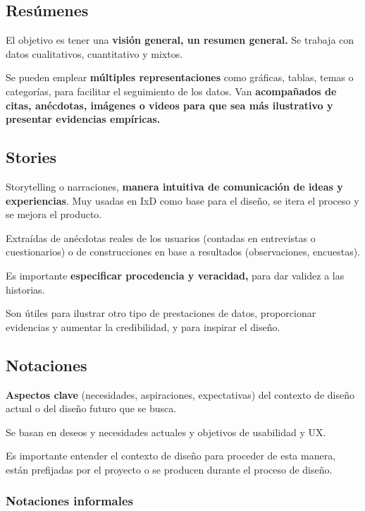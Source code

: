 \hypertarget{resuxfamenes}{%
\subsection{Resúmenes}\label{resuxfamenes}}

El objetivo es tener una \textbf{visión general, un resumen general.} Se
trabaja con datos cualitativos, cuantitativo y mixtos.

Se pueden emplear \textbf{múltiples representaciones} como gráficas,
tablas, temas o categorías, para facilitar el seguimiento de los datos.
Van \textbf{acompañados de citas, anécdotas, imágenes o videos para que
sea más ilustrativo y presentar evidencias empíricas.}

\hypertarget{stories}{%
\subsection{Stories}\label{stories}}

Storytelling o narraciones, \textbf{manera intuitiva de comunicación de
ideas y experiencias}. Muy usadas en IxD como base para el diseño, se
itera el proceso y se mejora el producto.

Extraídas de anécdotas reales de los usuarios (contadas en entrevistas o
cuestionarios) o de construcciones en base a resultados (observaciones,
encuestas).

Es importante \textbf{especificar procedencia y veracidad,} para dar
validez a las historias.

Son útiles para ilustrar otro tipo de prestaciones de datos,
proporcionar evidencias y aumentar la credibilidad, y para inspirar el
diseño.

\hypertarget{notaciones}{%
\subsection{Notaciones}\label{notaciones}}

\textbf{Aspectos clave} (necesidades, aspiraciones, expectativas) del
contexto de diseño actual o del diseño futuro que se busca.

Se basan en deseos y necesidades actuales y objetivos de usabilidad y
UX.

Es importante entender el contexto de diseño para proceder de esta
manera, están prefijadas por el proyecto o se producen durante el
proceso de diseño.

\hypertarget{notaciones-informales}{%
\subsubsection{Notaciones informales}\label{notaciones-informales}}


